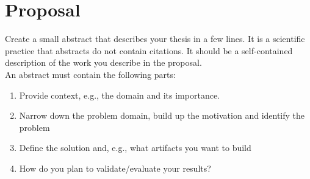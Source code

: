 %
%
%
%


\newcommand{\authorname}{}

\newcommand{\worktype}{Research Proposal}
\newcommand{\proposalTitle}{Proposal Title}

\newcommand{\supervisor}{Paul Schmiedmayer, PhD}
\newcommand{\advisors}{}

\newcommand{\submissionDate}{\today}



 





\frontmatter




\mainmatter

\chapter*{Proposal}

\begin{tcolorbox}[breakable]
	Create a small abstract that describes your thesis in a few lines.
	It is a scientific practice that abstracts do not contain citations.
	It should be a self-contained description of the work you describe in the proposal.
	\\
	An abstract must contain the following parts:
	\begin{enumerate}
		\item Provide context, e.g., the domain and its importance.
		\item Narrow down the problem domain, build up the motivation and identify the problem
		\item Define the solution and, e.g., what artifacts you want to build
		\item How do you plan to validate/evaluate your results?
	\end{enumerate}
\end{tcolorbox}

